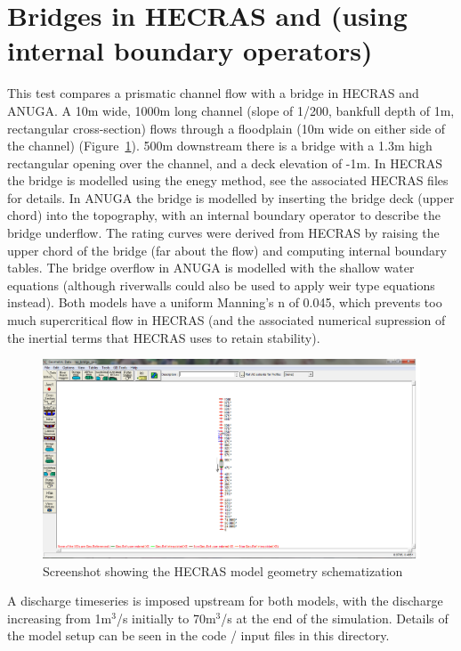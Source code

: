 \section{Bridges in HECRAS and \anuga{} (using internal boundary operators)}
This test compares a prismatic channel flow with a bridge in HECRAS and ANUGA.
A 10m wide, 1000m long channel (slope of 1/200, bankfull depth of 1m,
rectangular cross-section) flows through a floodplain (10m wide on either side
of the channel) (Figure~\ref{schematic}). 500m downstream there is a bridge
with a 1.3m high rectangular opening over the channel, and a deck elevation of
-1m. In HECRAS the bridge is modelled using the enegy method, see the
associated HECRAS files for details. In ANUGA the bridge is modelled by
inserting the bridge deck (upper chord) into the topography, with an internal
boundary operator to describe the bridge underflow. The rating curves were
derived from HECRAS by raising the upper chord of the bridge (far about the
flow) and computing internal boundary tables.  The bridge overflow in ANUGA is
modelled with the shallow water equations (although riverwalls could also be
used to apply weir type equations instead). Both models have a uniform
Manning's n of 0.045, which prevents too much supercritical flow in HECRAS (and
the associated numerical supression of the inertial terms that HECRAS uses to
retain stability).

\begin{figure}
\begin{center}
\includegraphics[width=1.0\textwidth]{hecras_bridge_test/RASGeometry_Bridge.png}
\end{center}
\caption{Screenshot showing the HECRAS model geometry schematization}
\label{schematic}
\end{figure}


A discharge timeseries is imposed upstream for both models, with the discharge
increasing from 1m$^3$/s initially to 70m$^3$/s at the end of the simulation.
Details of the model setup can be seen in the code / input files in this
directory.

